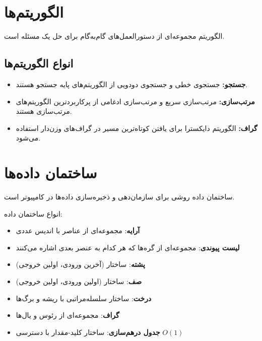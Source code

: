 \documentclass{matinbook}
\begin{document}
\section{الگوریتم‌ها}

الگوریتم مجموعه‌ای از دستورالعمل‌های
گام‌به‌گام برای حل یک مسئله است.

\subsection{انواع الگوریتم‌ها}

\begin{itemize}
    \item \textbf{جستجو:}
    جستجوی خطی و
    جستجوی دودویی
    از الگوریتم‌های پایه جستجو هستند.
    
    \item \textbf{مرتب‌سازی:}
    مرتب‌سازی سریع و
    مرتب‌سازی ادغامی
    از پرکاربردترین الگوریتم‌های مرتب‌سازی هستند.
    
    \item \textbf{گراف:}
    الگوریتم دایکسترا برای
    یافتن کوتاه‌ترین مسیر
    در گراف‌های وزن‌دار استفاده می‌شود.
\end{itemize}

\section{ساختمان داده‌ها}

ساختمان داده روشی برای
سازمان‌دهی و ذخیره‌سازی داده‌ها در کامپیوتر است.

انواع ساختمان داده:

\begin{itemize}
    \item \textbf{آرایه}:
    مجموعه‌ای از عناصر با اندیس عددی
    \item \textbf{لیست پیوندی}:
    مجموعه‌ای از گره‌ها که هر کدام
    به عنصر بعدی اشاره می‌کنند
    \item \textbf{پشته}:
    ساختار 
    (آخرین ورودی، اولین خروجی)
    \item \textbf{صف}:
    ساختار 
    (اولین ورودی، اولین خروجی)
    \item \textbf{درخت}:
    ساختار سلسله‌مراتبی
    با ریشه و برگ‌ها
    \item \textbf{گراف}:
    مجموعه‌ای از رئوس و یال‌ها
    \item \textbf{جدول درهم‌سازی}:
    ساختار کلید-مقدار با دسترسی $O(1)$
\end{itemize}
\end{document}
